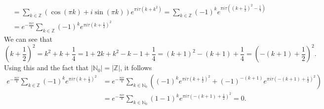 \documentclass[A4,12pt,twoside]{book}
\begin{document}
{\begin{align*}
        &= \sum_{k \in \mathbb{Z}}(\cos (\pi k) + i \sin (\pi k))  e^{ \pi i  \tau (k+k^2) } = \sum_{k \in \mathbb{Z}} (-1)^k e^{ \pi i  \tau ((k+ \frac{1}{2})^2 - \frac{1}{4} )} \\
        &= e^{-\frac{\pi i  \tau}{4}}\sum_{k \in \mathbb{Z}} (-1)^k e^{ \pi i  \tau (k+ \frac{1}{2})^2  } 
    \end{align*}
    We can see that 
    \[
    (k+\frac{1}{2})^2 = k^2 + k + \frac{1}{4} = 1 + 2k + k^2 -k -1 + \frac{1}{4} = (k+1)^2 - (k+1) + \frac{1}{4} = (- (k+1) + \frac{1}{2})^2.
    \]
    Using this and the fact that $|\mathbb{N}_0| = |\mathbb{Z}|$, it follows 
    \begin{align*}
    e^{-\frac{\pi i  \tau}{4}}\sum_{k \in \mathbb{Z}} (-1)^k e^{ \pi i  \tau (k+ \frac{1}{2})^2  } &= e^{-\frac{\pi i  \tau}{4}}\sum_{k \in \mathbb{N}_0} \left( (-1)^k e^{ \pi i  \tau (k+ \frac{1}{2})^2  } + (-1)^{-(k+1)} e^{ \pi i  \tau (-(k+1)+ \frac{1}{2})^2  } \right)  \\
    &= e^{-\frac{\pi i  \tau}{4}}\sum_{k \in \mathbb{N}_0} (1-1)^k e^{ \pi i  \tau (-(k+1)+ \frac{1}{2})^2  } =0.
    \end{align*}
}
\end{document}
